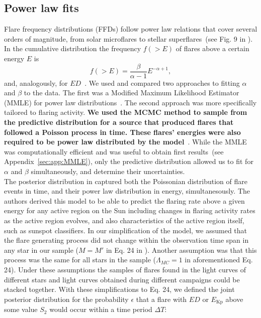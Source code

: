 \documentclass{aa}
\begin{document}
\subsection{Power law fits}
\label{powerlawfits}
Flare frequency distributions (FFDs) follow power law relations that cover several orders of magnitude, from solar microflares to stellar superflares~(see Fig. 9 in \citealt{shibayama2013}). In the cumulative distribution the frequency $f(>E)$ of flares above a certain energy $E$ is
\begin{equation}
f(>E) = \dfrac{\beta}{\alpha - 1}E^{-\alpha + 1},
\label{eqn:cumdist}
\end{equation}
and, analogously, for $ED$~\citep{gershberg1972}. We used and compared two approaches to fitting $\alpha$ and $\beta$ to the data. The first was a Modified Maximum Likelihood Estimator (MMLE) for power law distributions~\citep{maschberger2009}. The second approach was more specifically tailored to flaring activity. \textbf{We used the MCMC method to sample from the predictive distribution for a source that produced flares that followed a Poisson process in time. These flares' energies were also required to be power law distributed by the model}~\citep{wheatland_flaresbayes_2004}. While the MMLE was computationally efficient and was useful to obtain first results~(see Appendix~\ref{sec:app:MMLE}), only the predictive distribution allowed us to fit for $\alpha$ and $\beta$ simultaneously, and determine their uncertainties.
\\
The posterior distribution in \citet{wheatland_flaresbayes_2004} captured both the Poissonian distribution of flare events in time, and their power law distribution in energy, simultanesously. The authors derived this model to be able to predict the flaring rate above a given energy for any active region on the Sun including changes in flaring activity rates as the active region evolves, and also characteristics of the active region itself, such as sunspot classifiers. In our simplification of the model, we assumed that the flare generating process did not change within the observation time span in any star in our sample ($M=M'$ in Eq. 24 in \citealt{wheatland_flaresbayes_2004}). Another assumption was that this process was the same for all stars in the sample ($\Lambda_{MC}=1$ in aforementioned Eq. 24). Under these assumptions the samples of flares found in the light curves of different stars and light curves obtained during different campaigns could be stacked together. With these simplifications to Eq. 24, we defined the joint posterior distribution for the probability $\epsilon$ that a flare with $ED$ or $E_\mathrm{Kp}$ above some value $S_2$ would occur within a time period $\Delta T$:
\end{document}
